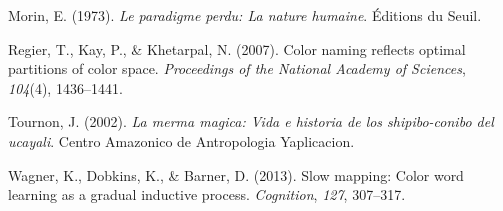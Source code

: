\documentclass[
  english,
  ,man,floatsintext]{apa6}
\begin{document}
\leavevmode\hypertarget{ref-morin1973}{}%
Morin, E. (1973). \emph{Le paradigme perdu: La nature humaine}. Éditions du Seuil.

\leavevmode\hypertarget{ref-regier2007}{}%
Regier, T., Kay, P., \& Khetarpal, N. (2007). Color naming reflects optimal partitions of color space. \emph{Proceedings of the National Academy of Sciences}, \emph{104}(4), 1436--1441.

\leavevmode\hypertarget{ref-tournon2002}{}%
Tournon, J. (2002). \emph{La merma magica: Vida e historia de los shipibo-conibo del ucayali}. Centro Amazonico de Antropologia Yaplicacion.

\leavevmode\hypertarget{ref-wagner2013}{}%
Wagner, K., Dobkins, K., \& Barner, D. (2013). Slow mapping: Color word learning as a gradual inductive process. \emph{Cognition}, \emph{127}, 307--317.

\endgroup
\end{document}
